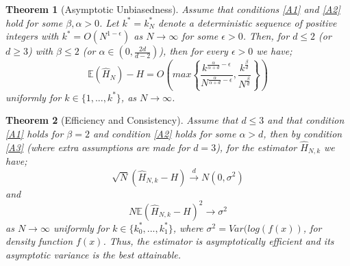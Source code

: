 \documentclass{report}
\newtheorem{theorem}{Theorem}
\begin{document}
\begin{theorem}[Asymptotic Unbiasedness] \label{unbias}
Assume that conditions \ref{A1} and \ref{A2} hold for some $\beta, \alpha > 0$. Let  $k^{*} = k_{N}^{*}$ denote a deterministic sequence of positive integers with $k^{*} = O(N^{1-\epsilon})$ as $N \to \infty$  for some $\epsilon > 0$. Then, for $d \leq 2$ (or $d \geq 3$) with $\beta \leq 2$ (or $\alpha \in (0, \frac{2d}{d-2})$), then for every $\epsilon >0$ we have;
\begin{equation} \label{unbias_equation}
\mathbb{E} ( \hat{H}_{N} ) - H = O \left( max \left\{ \frac{k^{\frac{\alpha}{\alpha + d} - \epsilon}}{N^{\frac{\alpha}{\alpha + d} - \epsilon}}, \frac{k^{\frac{\beta}{d}}}{N^{\frac{\beta}{d}}} \right\} \right)
\end{equation}
uniformly for $k \in \{1, ..., k^{*}\}$, as $N \to \infty$.
\end{theorem}


\begin{theorem}[Efficiency and Consistency] \label{efficient}
Assume that $d \leq 3$ and that condition \ref{A1} holds for $\beta = 2$ and condition \ref{A2} holds for some $\alpha > d$, then by condition \ref{A3} (where extra assumptions are made for $d=3$), for the estimator $\hat{H}_{N, k}$ we have;
\begin{equation} \label{efficiency_equation}
\sqrt{N}(\hat{H}_{N, k} - H) \xrightarrow{d} N(0, \sigma^2)
\end{equation}
and 
\begin{equation} \label{consistency_equation}
N \mathbb{E}{(\hat{H}_{N, k} - H)^2} \xrightarrow{} \sigma^2
\end{equation}
as $N \to \infty$ uniformly for $k \in \{ k_{0}^{*}, ...,  k_{1}^{*} \}$, where $\sigma^2 = Var(log(f(x))$, for density function $f(x)$. Thus, the estimator is asymptotically efficient and its asymptotic variance is the best attainable.
\end{theorem}
\end{document}

